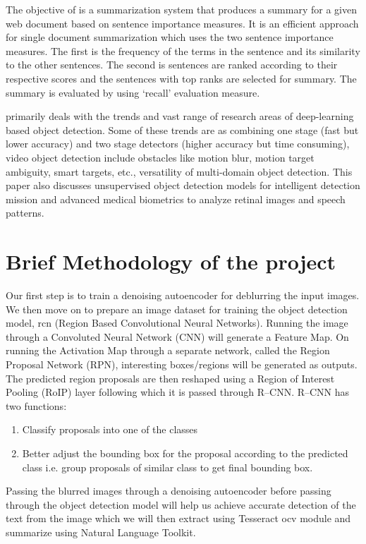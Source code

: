 The objective of \cite{reddy2012efficient} is a summarization system that produces a summary for a given web document based on sentence importance measures. It is an efficient approach for single document summarization which uses the two sentence importance measures. The first is the frequency of the terms in the sentence and its similarity to the other sentences. The second is sentences are ranked according to their respective scores and the sentences with top ranks are selected for summary. The summary is evaluated by using ‘recall’ evaluation measure.

\cite{jiao2019survey} primarily deals with the trends and vast range of research areas of deep-learning based object detection. Some of these trends are as combining one stage (fast but lower accuracy) and two stage detectors (higher accuracy but time consuming), video object detection include obstacles like motion blur, motion target ambiguity, smart targets, etc., versatility of multi-domain object detection. This paper also discusses unsupervised object detection models for intelligent detection mission and advanced medical biometrics to analyze retinal images and speech patterns.
    


\section[Brief Methodology of the project]{\textbf{Brief Methodology of the project}}
Our first step is to train a denoising autoencoder for deblurring the input images. We then move on to prepare an image dataset for training the object detection model, \acrlong{rcn} (Region Based Convolutional Neural Networks). Running the image through a Convoluted Neural Network (CNN) will generate a Feature Map. On running the Activation Map through a separate network, called the Region Proposal Network (RPN), interesting boxes/regions will be generated as outputs. The predicted region proposals are then reshaped using a Region of Interest Pooling (RoIP) layer following which it is passed through R--CNN. R--CNN has two functions:
\begin{enumerate}
\item Classify proposals into one of the classes
\item Better adjust the bounding box for the proposal according to the predicted class i.e. group proposals of similar class to get final bounding box.
\end{enumerate}
Passing the blurred images through a denoising autoencoder before passing through the object detection model will help us achieve accurate detection of the text from the image which we will then extract using Tesseract \acrshort{ocv} module and summarize using Natural Language Toolkit. 

